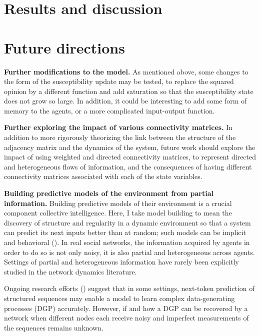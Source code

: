 \documentclass[]{article}
\begin{document}
\section{Results and discussion}






\newpage

\section{Future directions}

\textbf{Further modifications to the model.} As mentioned above, some changes to the form of the susceptibility update may be tested, to replace the squared opinion by a different function and add saturation so that the susceptibility state does not grow so large. In addition, it could be interesting to add some form of memory to the agents, or a more complicated input-output function.

\textbf{Further exploring the impact of various connectivity matrices.} In addition to more rigorously theorizing the link between the structure of the adjacency matrix and the dynamics of the system, future work should explore the impact of using weighted and directed connectivity matrices, to represent directed and heterogeneous flows of information, and the consequences of having different connectivity matrices associated with each of the state variables.

\textbf{Building predictive models of the environment from partial information.} Building predictive models of their environment is a crucial component collective intelligence. Here, I take model building to mean the discovery of structure and regularity in a dynamic environment so that a system can predict its next inputs better than at random; such models can be implicit and behavioral (\cite{crutchfieldCalculiEmergenceComputation1994}). In real social networks, the information acquired by agents in order to do so is not only noisy, it is also partial and heterogeneous across agents. Settings of partial and heterogeneous information have rarely been explicitly studied in the network dynamics literature.

Ongoing research efforts (\cite{malachAutoRegressiveNextTokenPredictors2023}) suggest that in some settings, next-token prediction of structured sequences may enable a model to learn complex data-generating processes (DGP) accurately. However, if and how a DGP can be recovered by a network when different nodes each receive noisy and imperfect measurements of the sequences remains unknown.
\end{document}
